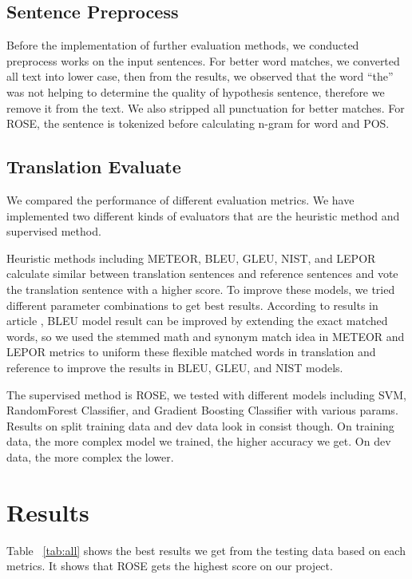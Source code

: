 \documentclass[11pt]{article}
\begin{document}
\subsection{Sentence Preprocess}
Before the implementation of further evaluation methods, we conducted preprocess works on the input sentences. For better word matches, we converted all text into lower case, then from the results, we observed that the word “the” was not helping to determine the quality of hypothesis sentence, therefore we remove it from the text. We also stripped all punctuation for better matches. For ROSE, the sentence is tokenized before calculating n-gram for word and POS.

\subsection{Translation Evaluate}
We compared the performance of different evaluation metrics. We have implemented two different kinds of evaluators that are the heuristic method and supervised method. 

Heuristic methods including METEOR, BLEU, GLEU, NIST, and LEPOR calculate similar between translation sentences and reference sentences and vote the translation sentence with a higher score. To improve these models, we tried different parameter combinations to get best results. According to results in article \cite{StatMT:08}, BLEU model result can be improved by extending the exact matched words, so we used the stemmed math and synonym match idea in METEOR and LEPOR metrics to uniform these flexible matched words in translation and reference to improve the results in BLEU, GLEU, and NIST models.

The supervised method is ROSE, we tested with different models including SVM, RandomForest Classifier, and Gradient Boosting Classifier with various params. Results on split training data and dev data look in consist though. On training data, the more complex model we trained, the higher accuracy we get. On dev data, the more complex the lower.

\section{Results}
\label{sec:length}

Table ~\ref{tab:all} shows the best results we get from the testing data based on each metrics. It shows that ROSE gets the highest score on our project.
\end{document}
